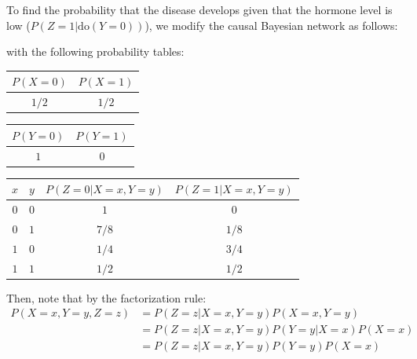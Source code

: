 \documentclass{article}
\begin{document}
To find the probability that the disease develops given that the hormone level is low ($P(Z = 1 | \mathrm{do}(Y = 0))$), we modify the causal Bayesian network as follows:
\begin{center}
\end{center}
with the following probability tables:
\begin{center}
\begin{tabular}{|c|c|}
    \hline
    $P(X = 0)$ & $P(X = 1)$ \\
    \hline
    $1/2$ & $1/2$ \\
    \hline
\end{tabular}
\end{center}
\begin{center}
\begin{tabular}{|c|c|}
    \hline
    $P(Y = 0)$ & $P(Y = 1)$ \\
    \hline
    $1$ & $0$ \\
    \hline
\end{tabular}
\end{center}
\begin{center}
\begin{tabular}{|c|c|c|c|}
    \hline
    $x$ & $y$ & $P(Z = 0 | X = x, Y = y)$ & $P(Z = 1 | X = x, Y = y)$ \\
    \hline
    $0$ & $0$ & $1$ & $0$ \\
    \hline
    $0$ & $1$ & $7/8$ & $1/8$ \\
    \hline
    $1$ & $0$ & $1/4$ & $3/4$ \\
    \hline
    $1$ & $1$ & $1/2$ & $1/2$ \\
    \hline
\end{tabular}
\end{center}
Then, note that by the factorization rule:
\begin{align*}
    P(X = x, Y = y, Z = z) & = P(Z = z | X = x, Y = y)P(X = x, Y = y) \\
    & = P(Z = z | X = x, Y = y)P(Y = y | X = x)P(X = x) \\
    & = P(Z = z | X = x, Y = y)P(Y = y)P(X = x) \\
\end{align*}
\end{document}
